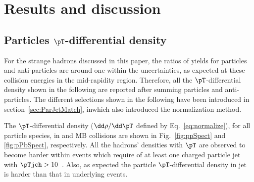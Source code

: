 
\section{Results and discussion}%
\label{sec:Results}

\subsection{Particles $\pT$-differential density}
\label{subsec:ParPtDensity}

For the strange hadrons discussed in this paper, the ratios of yields for particles and anti-particles are around one within the uncertainties, as expected at these collision energies in the mid-rapidity region.
Therefore, all the $\pT$-differential density shown in the following are reported after summing particles and anti-particles.
The different selections shown in the following have been introduced in section~\ref{sec:ParJetMatch}, inwhich also introduced the normalization method. 

The $\pT$-differential density ($\dd \rho/ \dd \pT$ defined by Eq.~\ref{eq:normalize}), for all particle species, in \pp and MB \pPb collisions are shown in Fig.~\ref{fig:ppSpect} and \ref{fig:pPbSpect}, respectively.
All the hadrons' densities with $\pT$ are observed to become harder within events which require of at least one charged particle jet with $\pTjch > 10$~\GeVc.
Also, as expected the particle $\pT$-differential density in jet is harder than that in underlying events.

